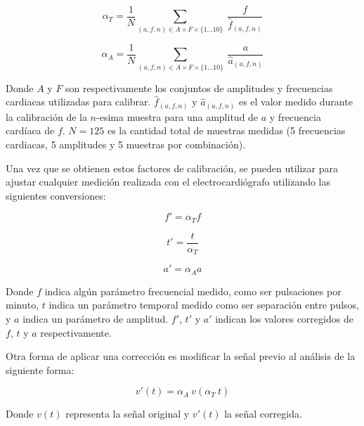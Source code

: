 \documentclass[conference]{IEEEtran}
\begin{document}
\begin{equation}
\alpha_{T} = \dfrac{1}{N} \sum_{(a,f,n) \in A \times F \times \{1...10 \}}\nolimits
~ \frac{f}{\hat{f}_{(a,f,n)}}
\label{eqn:alpha_f}
\end{equation} 


\begin{equation}
\alpha_{A} = \dfrac{1}{N} \sum_{(a,f,n) \in A \times F \times \{1...10 \}}\nolimits
~ \frac{a}{\hat{a}_{(a,f,n)}}
\label{eqn:alpha_a}
\end{equation}



Donde $A$ y $F$ son respectivamente los conjuntos de amplitudes y frecuencias
cardiacas utilizadas para calibrar. $\hat{f}_{(a,f,n)}$ y $\hat{a}_{(a,f,n)}$ es el valor medido durante
la calibración de la $n$-esima muestra para una amplitud de $a$ y
frecuencia cardíaca de $f$. $N=125$ es la cantidad total de
muestras medidas (5 frecuencias cardiacas, 5 amplitudes y 5 muestras por combinación).

Una vez que se obtienen estos factores de calibración, se pueden utilizar para ajustar
cualquier medición realizada con el electrocardiógrafo utilizando las siguientes
conversiones:

\begin{equation}
    f' = \alpha_{T} f
    \label{eqn:f_correct}
\end{equation} 

\begin{equation}
    t' = \frac{t}{\alpha_{T}}
    \label{eqn:t_correct}
\end{equation} 

\begin{equation}
    a' = \alpha_{A} a
    \label{eqn:a_correct}
\end{equation} 
        




Donde $f$ indica algún parámetro frecuencial medido, como ser pulsaciones por minuto,
$t$ indica un parámetro temporal medido como ser separación entre pulsos, y
$a$ indica un parámetro de amplitud.
$f'$, $t'$ y $a'$ indican los valores corregidos de $f$, $t$ y $a$ respectivamente.


Otra forma de aplicar una corrección es modificar la señal previo al análisis
de la siguiente forma:

$$ v'(t) = \alpha_{A} ~ v(\alpha_T ~ t)$$

Donde $v(t)$ representa la señal original y $v'(t)$ la señal corregida.
\end{document}
